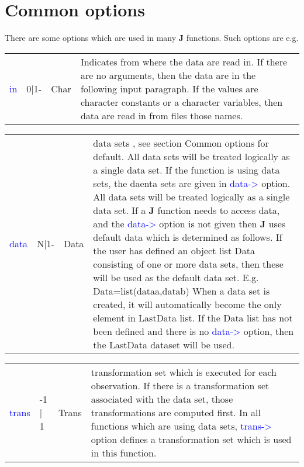 \section{Common options}
\label{comoptions}
 There are some options which are used in many \textbf{J} functions. Such options are e.g.
\begin{table}[H]
\begin{tabular}{ m{}  m{}m{}p{}}
\textcolor{blue}{in}&0|1-&Char&Indicates from where the data are read in. If there are no arguments,
then the data are in the following input paragraph. If the values are
character constants or a character variables, then data are read in from files those names.
\\ \cline{1-4}
\end{tabular}
\end{table}
\vspace{-1.51em}
\begin{table}[H]
\begin{tabular}{ m{}  m{}m{}p{}}
\textcolor{blue}{data} & N|1- & Data &	data sets , see section Common options for default.
All data sets will be
 treated logically as a single data set.
 If the function is using data sets, the daenta sets are given in \textcolor{blue}{data->} option. All data sets will be
 treated logically as a single data set. If a \textbf{J} function needs to access data, and the \textcolor{blue}{data->}
 option is not given then \textbf{J} uses default data which is determined as follows.
 If the user has defined an object list Data consisting of one or more data sets, then these will
 be used as the default data set. E.g.
 Data=\textcolor{VioletRed}{list}(dataa,datab)
 When a data set is created, it will automatically become the only element in LastData list. If
 the Data list has not been defined and there is no \textcolor{blue}{data->} option, then the LastData dataset
 will be used.
\\ \cline{1-4}
\end{tabular}
\end{table}
\vspace{-1.51em}
\begin{table}[H]
\begin{tabular}{ m{}  m{}m{}p{}}
\textcolor{blue}{trans} &-1 | 1&Trans&	transformation set which is executed for each observation. If there is a transformation set associated with the data set, those transformations are computed first.
 In all functions which are using data sets, \textcolor{blue}{trans->} option defines a
 transformation set which is used in this function.
\\ \cline{1-4}
\end{tabular}
\end{table}
